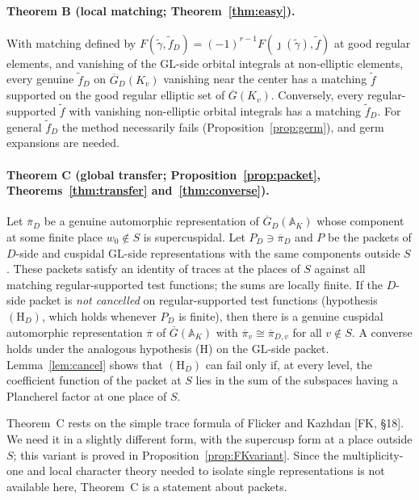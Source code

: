 \documentclass[12pt]{article}
\newcommand{\ov}[1]{\overline{#1}}
\newcommand{\A}{\mathbb{A}}
\newcommand{\GL}{\mathrm{GL}}
\newcommand{\Gb}{\ov{G}}
\newcommand{\GDb}{\ov{G}_D}
\newcommand{\pib}{\ov{\pi}}
\newcommand{\jj}{\jmath}
\theoremstyle{plain}
\theoremstyle{definition}
\begin{document}
\paragraph{Theorem B (local matching; Theorem~\ref{thm:easy}).} With matching defined by $F(\tilde\gamma,\tilde f_D)=(-1)^{r-1}F(\jj(\tilde\gamma),\tilde f)$ at good regular elements, and vanishing of the $\GL$-side orbital integrals at non-elliptic elements, every genuine $\tilde f_D$ on $\GDb(K_v)$ vanishing near the center has a matching $\tilde f$ supported on the good regular elliptic set of $\Gb(K_v)$. Conversely, every regular-supported $\tilde f$ with vanishing non-elliptic orbital integrals has a matching $\tilde f_D$. For general $\tilde f_D$ the method necessarily fails (Proposition~\ref{prop:germ}), and germ expansions are needed.

\paragraph{Theorem C (global transfer; Proposition~\ref{prop:packet}, Theorems~\ref{thm:transfer} and~\ref{thm:converse}).} Let $\pib_D$ be a genuine automorphic representation of $\GDb(\A_K)$ whose component at some finite place $w_0\notin S$ is supercuspidal. Let $P_D\ni\pib_D$ and $P$ be the packets of $D$-side and cuspidal $\GL$-side representations with the same components outside $S$. These packets satisfy an identity of traces at the places of $S$ against all matching regular-supported test functions; the sums are locally finite. If the $D$-side packet is \emph{not cancelled} on regular-supported test functions (hypothesis $(\mathrm H_D)$, which holds whenever $P_D$ is finite), then there is a genuine cuspidal automorphic representation $\pib$ of $\Gb(\A_K)$ with $\pib_v\cong\pib_{D,v}$ for all $v\notin S$. A converse holds under the analogous hypothesis (H) on the $\GL$-side packet. Lemma~\ref{lem:cancel} shows that $(\mathrm H_D)$ can fail only if, at every level, the coefficient function of the packet at $S$ lies in the sum of the subspaces having a Plancherel factor at one place of $S$.

Theorem~C rests on the simple trace formula of Flicker and Kazhdan [FK, \S18]. We need it in a slightly different form, with the supercusp form at a place outside $S$; this variant is proved in Proposition~\ref{prop:FKvariant}. Since the multiplicity-one and local character theory needed to isolate single representations is not available here, Theorem~C is a statement about packets.
\end{document}
